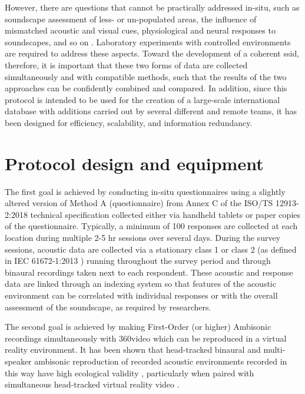  However, there are questions that cannot be practically addressed in-situ, such as soundscape assessment of less- or un-populated areas, the influence of mismatched acoustic and visual cues, physiological and neural responses to soundscapes, and so on \citep{Kogan2017comprehensive}. Laboratory experiments with controlled environments are required to address these aspects. Toward the development of a coherent \gls{ssid}, therefore, it is important that these two forms of data are collected simultaneously and with compatible methods, such that the results of the two approaches can be confidently combined and compared. In addition, since this protocol is intended to be used for the creation of a large-scale international database with additions carried out by several different and remote teams, it has been designed for efficiency, scalability, and information redundancy.

\section{Protocol design and equipment}
 The first goal is achieved by conducting in-situ questionnaires using a slightly altered version of Method A (questionnaire) from Annex C of the ISO/TS 12913-2:2018 technical specification \citep{ISO12913Part2} collected either via handheld tablets or paper copies of the questionnaire. Typically, a minimum of 100 responses are collected at each location during multiple 2-5 hr sessions over several days. During the survey sessions, acoustic data are collected via a stationary class 1 or class 2  (as defined in IEC 61672-1:2013 \citep{IEC61672Part1}) running throughout the survey period and through binaural recordings taken next to each respondent. These acoustic and response data are linked through an indexing system so that features of the acoustic environment can be correlated with individual responses or with the overall assessment of the soundscape, as required by researchers.

 The second goal is achieved by making First-Order (or higher) Ambisonic recordings simultaneously with 360\degree video which can be reproduced in a virtual reality environment. It has been shown that head-tracked binaural and multi-speaker ambisonic reproduction of recorded acoustic environments recorded in this way have high ecological validity \citep{Davies2014Soundscape}, particularly when paired with simultaneous head-tracked virtual reality video \citep{DeCoensel2017Urban,Hong2018Quality}.

